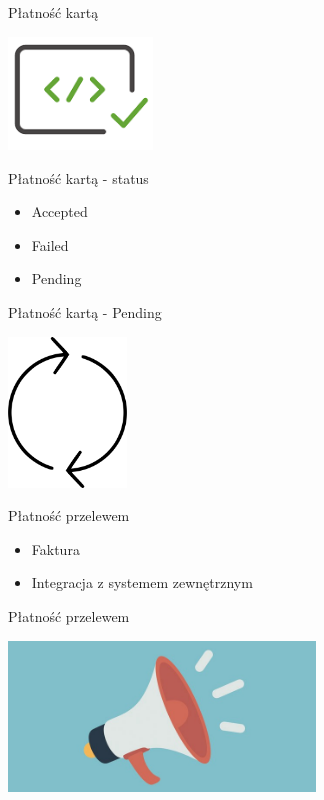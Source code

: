 \documentclass{beamer}
\begin{document}
\begin{frame}{Płatność kartą}
	\begin{center}
		\includegraphics[height=3cm]{response1.png}
	\end{center}
\end{frame}

\begin{frame}{Płatność kartą - status}
	\begin{huge}
		\begin{itemize}[<+->]
			\item Accepted
			\item Failed
			\item Pending
		\end{itemize}
	\end{huge}
\end{frame}

\begin{frame}{Płatność kartą - Pending}
	\begin{center}
		\includegraphics[height=4cm]{cykl1.png}
	\end{center}
\end{frame}

\begin{frame}{Płatność przelewem}
	\begin{huge}
		\begin{itemize}[<+->]
			\item Faktura
			\item Integracja z systemem zewnętrznym
		\end{itemize}
	\end{huge}
\end{frame}

\begin{frame}{Płatność przelewem}
	\begin{center}
  		\includegraphics[height=4cm]{notification3.jpeg}
	\end{center}
\end{frame}
\end{document}
